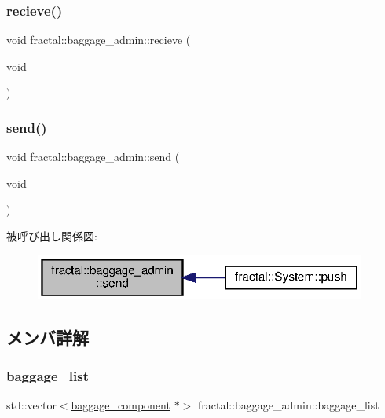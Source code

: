 \subsubsection{\texorpdfstring{recieve()}{recieve()}}
{\footnotesize\ttfamily void fractal\+::baggage\+\_\+admin\+::recieve (\begin{DoxyParamCaption}\item[{void}]{ }\end{DoxyParamCaption})\hspace{0.3cm}{\ttfamily [inline]}}

\mbox{\label{classfractal_1_1baggage__admin_a8fe4cbff60f094b3c659931c0cd3d251}} 
\subsubsection{\texorpdfstring{send()}{send()}}
{\footnotesize\ttfamily void fractal\+::baggage\+\_\+admin\+::send (\begin{DoxyParamCaption}\item[{void}]{ }\end{DoxyParamCaption})\hspace{0.3cm}{\ttfamily [inline]}}

被呼び出し関係図\+:
\nopagebreak
\begin{figure}[H]
\begin{center}
\leavevmode
\includegraphics[width=308pt]{classfractal_1_1baggage__admin_a8fe4cbff60f094b3c659931c0cd3d251_icgraph}
\end{center}
\end{figure}


\subsection{メンバ詳解}
\mbox{\label{classfractal_1_1baggage__admin_afd92550fac7866335a3b55b78174887f}} 
\subsubsection{\texorpdfstring{baggage\+\_\+list}{baggage\_list}}
{\footnotesize\ttfamily std\+::vector$<$\hyperlink{classfractal_1_1baggage__component}{baggage\+\_\+component} $\ast$$>$ fractal\+::baggage\+\_\+admin\+::baggage\+\_\+list}

